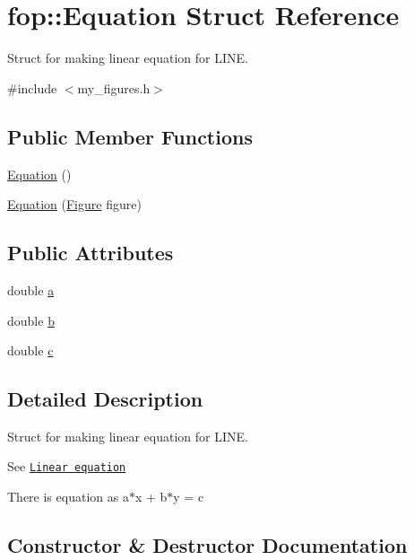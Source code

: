 \hypertarget{structfop_1_1_equation}{}\section{fop\+:\+:Equation Struct Reference}
\label{structfop_1_1_equation}


Struct for making linear equation for L\+I\+NE.  




{\ttfamily \#include $<$my\+\_\+figures.\+h$>$}

\subsection*{Public Member Functions}
\begin{DoxyCompactItemize}
\item 
\mbox{\hyperlink{structfop_1_1_equation_a6cd4c227e9b83e949c4c2568854512a3}{Equation}} ()
\item 
\mbox{\hyperlink{structfop_1_1_equation_a93886a166390114aa62609af6ddd1d72}{Equation}} (\mbox{\hyperlink{classfop_1_1_figure}{Figure}} figure)
\end{DoxyCompactItemize}
\subsection*{Public Attributes}
\begin{DoxyCompactItemize}
\item 
double \mbox{\hyperlink{structfop_1_1_equation_a9cc4610dcc3a68de1def70a8573cf75f}{a}}
\item 
double \mbox{\hyperlink{structfop_1_1_equation_a6bf704c5c87c9a321c18869f634a5ff1}{b}}
\item 
double \mbox{\hyperlink{structfop_1_1_equation_a795ea1202f12b407544c305d79e39872}{c}}
\end{DoxyCompactItemize}


\subsection{Detailed Description}
Struct for making linear equation for L\+I\+NE. 

See \href{https://en.wikipedia.org/wiki/Linear_equation}{\tt Linear equation}

There is equation as a$\ast$x + b$\ast$y = c 

\subsection{Constructor \& Destructor Documentation}
\mbox{\label{structfop_1_1_equation_a6cd4c227e9b83e949c4c2568854512a3}} 
